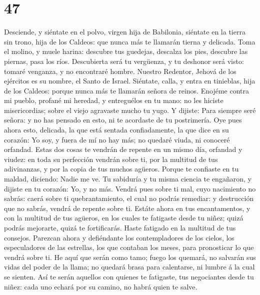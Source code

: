 \hypertarget{section-46}{%
\section{47}\label{section-46}}

 Desciende, y siéntate en el polvo, virgen hija de
Babilonia, siéntate en la tierra sin trono, hija de los Caldeos: que
nunca más te llamarán tierna y delicada.  Toma el molino, y
muele harina: descubre tus guedejas, descalza los pies, descubre las
piernas, pasa los ríos.  Descubierta será tu vergüenza, y tu
deshonor será visto: tomaré venganza, y no encontraré hombre.
 Nuestro Redentor, Jehová de los ejércitos es su nombre, el
Santo de Israel.  Siéntate, calla, y entra en tinieblas,
hija de los Caldeos: porque nunca más te llamarán señora de reinos.
 Enojéme contra mi pueblo, profané mi heredad, y entreguélos
en tu mano: no les hiciste misericordias; sobre el viejo agravaste mucho
tu yugo.  Y dijiste: Para siempre seré señora: y no has
pensado en esto, ni te acordaste de tu postrimería.  Oye
pues ahora esto, delicada, la que está sentada confiadamente, la que
dice en su corazón: Yo soy, y fuera de mí no hay más; no quedaré viuda,
ni conoceré orfandad.  Estas dos cosas te vendrán de repente
en un mismo día, orfandad y viudez: en toda su perfección vendrán sobre
ti, por la multitud de tus adivinanzas, y por la copia de tus muchos
agüeros.  Porque te confiaste en tu maldad, diciendo: Nadie
me ve. Tu sabiduría y tu misma ciencia te engañaron, y dijiste en tu
corazón: Yo, y no más.  Vendrá pues sobre ti mal, cuyo
nacimiento no sabrás: caerá sobre ti quebrantamiento, el cual no podrás
remediar: y destrucción que no sabrás, vendrá de repente sobre ti.
 Estáte ahora en tus encantamentos, y con la multitud de
tus agüeros, en los cuales te fatigaste desde tu niñez; quizá podrás
mejorarte, quizá te fortificarás.  Haste fatigado en la
multitud de tus consejos. Parezcan ahora y defiéndante los
contempladores de los cielos, los especuladores de las estrellas, los
que contaban los meses, para pronosticar lo que vendrá sobre ti.
 He aquí que serán como tamo; fuego los quemará, no
salvarán sus vidas del poder de la llama; no quedará brasa para
calentarse, ni lumbre á la cual se sienten.  Así te serán
aquellos con quienes te fatigaste, tus negociantes desde tu niñez: cada
uno echará por su camino, no habrá quien te salve.

